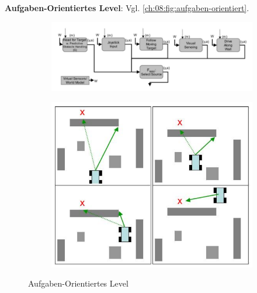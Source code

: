 \textbf{Aufgaben-Orientiertes Level}:
Vgl. \autoref{ch:08:fig:aufgaben-orientiert}.
\begin{figure}[h!]
	\begin{subfigure}{.5\textwidth}
		\centering
		\includegraphics[width=\textwidth]{figures/aufgaben_level.png}
	\end{subfigure}
	\begin{subfigure}{.5\textwidth}
		\centering
		\includegraphics[width=\textwidth]{figures/aufgaben_level_1.png}
	\end{subfigure}
	\caption{Aufgaben-Orientiertes Level}
	\label{ch:08:fig:aufgaben-orientiert}
\end{figure}
